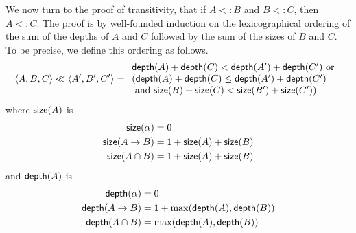 \documentclass{article}
\begin{document}
We now turn to the proof of transitivity, that if $A <: B$ and $B <:
C$, then $A <: C$. The proof is by well-founded induction on the
lexicographical ordering of the sum of the depths of $A$ and $C$
followed by the sum of the sizes of $B$ and $C$. To be precise, we
define this ordering as follows.
\[
\langle A, B, C \rangle \ll \langle A', B', C' \rangle
=
\begin{array}{l}
\mathsf{depth}(A) + \mathsf{depth}(C) < \mathsf{depth}(A') + \mathsf{depth}(C')
\text{ or } \\
(\mathsf{depth}(A) + \mathsf{depth}(C)
\leq
\mathsf{depth}(A') + \mathsf{depth}(C') \\
\text{ and }
\mathsf{size}(B) + \mathsf{size}(C)
<
\mathsf{size}(B') + \mathsf{size}(C'))
\end{array}
\]
where $\mathsf{size}(A)$ is 
\begin{align*}
  \mathsf{size}(\alpha) &= 0 \\
  \mathsf{size}(A \to B) &= 1 + \mathsf{size}(A) + \mathsf{size}(B) \\
  \mathsf{size}(A \cap B) &= 1 + \mathsf{size}(A) + \mathsf{size}(B)
\end{align*}
and $\mathsf{depth}(A)$ is 
\begin{align*}
  \mathsf{depth}(\alpha) &= 0 \\
  \mathsf{depth}(A \to B) &= 1 + \max(\mathsf{depth}(A), \mathsf{depth}(B)) \\
  \mathsf{depth}(A \cap B) &= \max(\mathsf{depth}(A), \mathsf{depth}(B))
\end{align*}
\end{document}
